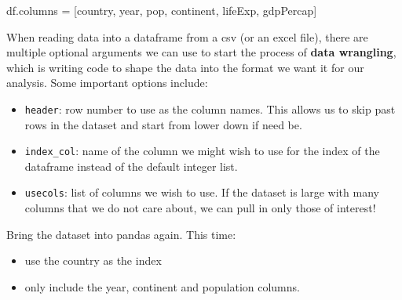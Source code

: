 \documentclass[
  letterpaper,
  DIV=11,
  numbers=noendperiod]{scrreprt}
\newenvironment{Shaded}{\begin{snugshade}}{\end{snugshade}}
\newcommand{\NormalTok}[1]{\textcolor[rgb]{0.00,0.23,0.31}{#1}}
\newcommand{\OperatorTok}[1]{\textcolor[rgb]{0.37,0.37,0.37}{#1}}
\newcommand{\StringTok}[1]{\textcolor[rgb]{0.13,0.47,0.30}{#1}}
\providecommand{\tightlist}{%
  \setlength{\itemsep}{0pt}\setlength{\parskip}{0pt}}\usepackage{longtable,booktabs,array}
\begin{document}
\begin{tcolorbox}
\begin{Shaded}
\begin{Highlighting}[]
\NormalTok{df.columns }\OperatorTok{=}\NormalTok{ [}\StringTok{\textquotesingle{}country\textquotesingle{}}\NormalTok{, }\StringTok{\textquotesingle{}year\textquotesingle{}}\NormalTok{, }\StringTok{\textquotesingle{}pop\textquotesingle{}}\NormalTok{, }\StringTok{\textquotesingle{}continent\textquotesingle{}}\NormalTok{, }\StringTok{\textquotesingle{}lifeExp\textquotesingle{}}\NormalTok{, }\StringTok{\textquotesingle{}gdpPercap\textquotesingle{}}\NormalTok{]}
\end{Highlighting}
\end{Shaded}

\end{tcolorbox}

When reading data into a dataframe from a csv (or an excel file), there
are multiple optional arguments we can use to start the process of
\textbf{data wrangling}, which is writing code to shape the data into
the format we want it for our analysis. Some important options include:

\begin{itemize}
\tightlist
\item
  \texttt{header}: row number to use as the column names. This allows us
  to skip past rows in the dataset and start from lower down if need be.
\item
  \texttt{index\_col}: name of the column we might wish to use for the
  index of the dataframe instead of the default integer list.
\item
  \texttt{usecols}: list of columns we wish to use. If the dataset is
  large with many columns that we do not care about, we can pull in only
  those of interest!
\end{itemize}

\begin{tcolorbox}[enhanced jigsaw, rightrule=.15mm, opacitybacktitle=0.6, colback=white, toprule=.15mm, colframe=quarto-callout-warning-color-frame, bottomtitle=1mm, bottomrule=.15mm, arc=.35mm, coltitle=black, breakable, title={Challenge 1}, titlerule=0mm, opacityback=0, colbacktitle=quarto-callout-warning-color!10!white, left=2mm, toptitle=1mm, leftrule=.75mm]

Bring the dataset into pandas again. This time:

\begin{itemize}
\tightlist
\item
  use the country as the index
\item
  only include the year, continent and population columns.
\end{itemize}

\end{tcolorbox}
\end{document}
